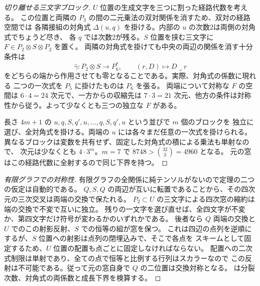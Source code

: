 \begin{proof}[切り離せる三文字ブロック]
$U$ 位置の生成文字を三つに割った経路代数を考える。
この位置と両隣の $P_3$ の間の二元乗法の双対関係を消すため、双対の経路空間では
各隣接組の対角式 $\Delta(u,q)$ を掛ける。内部の $u$ の次数2は両側の対角式でちょうど尽き、
各 $q$ では次数2が残る。$S$ 位置を挟む三文字に
$F\in P_2\otimes S\otimes P_2$ を置く。
両隣の対角式を掛けても中央の両辺の関係を消す十分条件は
\[
 \bar\gamma:P_2\otimes S\to P_6^*,\qquad (r,D)\longmapsto D\mathbin{\lrcorner}r
\]
をどちらの端から作用させても零となることである。実際、対角式の係数に現れる
二つの一次式を $P_5$ に掛けたものは $P_6$ を張る。
両端について対称な $F$ の空間は $6\cdot4=24$ 次元で、一方からの収縮先は
$7\cdot3=21$ 次元、他方の条件は対称性から従う。よって少なくとも三つの独立な $F$ がある。

長さ $4m+1$ の $u,q,S,q',u,\ldots,q,S,q',u$ という並びで $m$ 個のブロックを
独立に選び、全対角式を掛ける。両端の $u$ には各々まだ任意の一次式を掛けられる。
異なるブロックは変数を共有せず、固定した対角式の積による乗法も単射なので、
次元は少なくとも $4\cdot3^m$。$m=7$ で $8748>\binom{32}3=4960$ となる。
元の窓はこの経路代数に全射するので同じ下界を持つ。
\end{proof}
\begin{proof}[有限グラフでの対称性]
有限グラフの全関係に純テンソルがないので定理の二つの仮定は自動的である。
$Q,S,Q$ の両辺が互いに転置であることから、その四次元の三次交叉は両端の交換で保たれる。
$P_2\subset U$ の三文字による四次窓の縮約は端の交換で不変で互いに独立。
残りの一文字を選び直せば、全四文字が不変か、第四文字だけ符号が変わるかのいずれかである。
後者なら $Q$ 両端の交換と $U$ でのこの射影反射、$S$ での恒等の組が窓を保つ。
これは四辺の点列を逆順にするが、$S$ 位置への射影は点列の閉埋込みで、そこで各点を
スキームとして固定するため、$U$ 位置の配置も点ごとに固定しなければならない。
配置への二次式制限は単射であり、全ての点で恒等と比例する行列はスカラーなので
この反射は不可能である。従って元の窓自身で $Q$ の二位置は交換対称となる。
は分裂次数、対角式の両係数と成長下界を検算する。
\end{proof}
